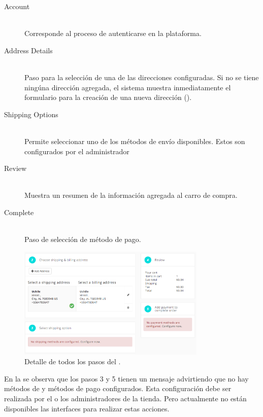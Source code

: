 	\begin{description}
		\item[Account] \hfill \\
			Corresponde al proceso de autenticarse en la plataforma.
		\item[Address Details] \hfill \\
			Paso para la selección de una de las direcciones configuradas. Si no se tiene ningúna dirección agregada, el sistema muestra inmediatamente el formulario para la creación de una nueva dirección ().
		\item[Shipping Options] \hfill \\
			Permite seleccionar uno de los métodos de envío disponibles. Estos son configurados por el administrador 
		\item[Review] \hfill \\
			Muestra un resumen de la información agregada al carro de compra. 
		\item[Complete] \hfill \\
			Paso de selección de método de pago.
	\end{description}


	\begin{figure}[H]
		\centering
		\includegraphics[width=0.8\textwidth]{figuras/shipping/steps.png}
		\caption{Detalle de todos los pasos del \workflowCPT \shippingEF.}
		\label{figure:checkout:steps}
	\end{figure}

	En la  se observa que los pasos 3 y 5 tienen un mensaje advirtiendo que no hay métodos de \shippingEF y métodos de pago configurados. Esta configuración debe ser realizada por el o los administradores de la tienda. Pero actualmente no están disponibles las interfaces para realizar estas acciones.

